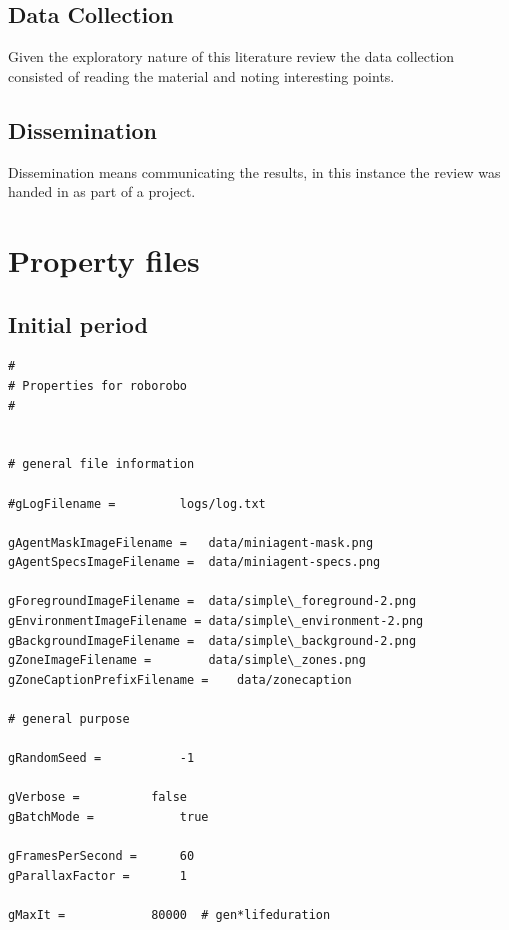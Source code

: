 \documentclass[a4paper]{book}
\begin{document}
\begin{appendices}


				\section{Data Collection}
				Given the exploratory nature of this literature review the data collection consisted of reading the material and
				noting interesting points. 


\section{Dissemination}
Dissemination means communicating the results, in this instance the review was handed in as part
of a project.

\chapter{Property files}

\section{Initial period}

\lstset{ basicstyle= \footnotesize}

\begin{lstlisting}
#
# Properties for roborobo
#


# general file information

#gLogFilename =			logs/log.txt

gAgentMaskImageFilename =	data/miniagent-mask.png
gAgentSpecsImageFilename =	data/miniagent-specs.png

gForegroundImageFilename =	data/simple\_foreground-2.png
gEnvironmentImageFilename =	data/simple\_environment-2.png
gBackgroundImageFilename =	data/simple\_background-2.png			
gZoneImageFilename =		data/simple\_zones.png
gZoneCaptionPrefixFilename =	data/zonecaption

# general purpose

gRandomSeed = 			-1

gVerbose = 			false 
gBatchMode = 			true				

gFramesPerSecond = 		60
gParallaxFactor = 		1

gMaxIt =  			80000  # gen*lifeduration 


\end{lstlisting}
\end{appendices}
\end{document}
